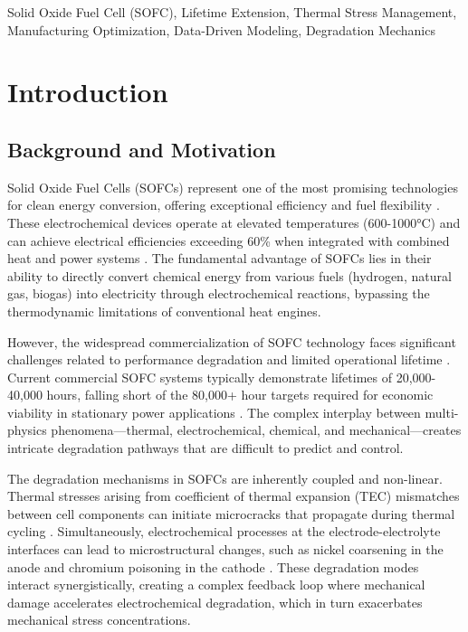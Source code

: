 \documentclass[conference]{IEEEtran}
\begin{document}
\begin{IEEEkeywords}
Solid Oxide Fuel Cell (SOFC), Lifetime Extension, Thermal Stress Management, Manufacturing Optimization, Data-Driven Modeling, Degradation Mechanics
\end{IEEEkeywords}

\section{Introduction}

\subsection{Background and Motivation}

Solid Oxide Fuel Cells (SOFCs) represent one of the most promising technologies for clean energy conversion, offering exceptional efficiency and fuel flexibility \cite{singhal2000advances}. These electrochemical devices operate at elevated temperatures (600-1000°C) and can achieve electrical efficiencies exceeding 60\% when integrated with combined heat and power systems \cite{steele2001materials}. The fundamental advantage of SOFCs lies in their ability to directly convert chemical energy from various fuels (hydrogen, natural gas, biogas) into electricity through electrochemical reactions, bypassing the thermodynamic limitations of conventional heat engines.

However, the widespread commercialization of SOFC technology faces significant challenges related to performance degradation and limited operational lifetime \cite{tu2019progress}. Current commercial SOFC systems typically demonstrate lifetimes of 20,000-40,000 hours, falling short of the 80,000+ hour targets required for economic viability in stationary power applications \cite{steele2001materials}. The complex interplay between multi-physics phenomena—thermal, electrochemical, chemical, and mechanical—creates intricate degradation pathways that are difficult to predict and control.

The degradation mechanisms in SOFCs are inherently coupled and non-linear. Thermal stresses arising from coefficient of thermal expansion (TEC) mismatches between cell components can initiate microcracks that propagate during thermal cycling \cite{selcuk2000modelling}. Simultaneously, electrochemical processes at the electrode-electrolyte interfaces can lead to microstructural changes, such as nickel coarsening in the anode and chromium poisoning in the cathode \cite{jiang2012chromium}. These degradation modes interact synergistically, creating a complex feedback loop where mechanical damage accelerates electrochemical degradation, which in turn exacerbates mechanical stress concentrations.
\end{document}
